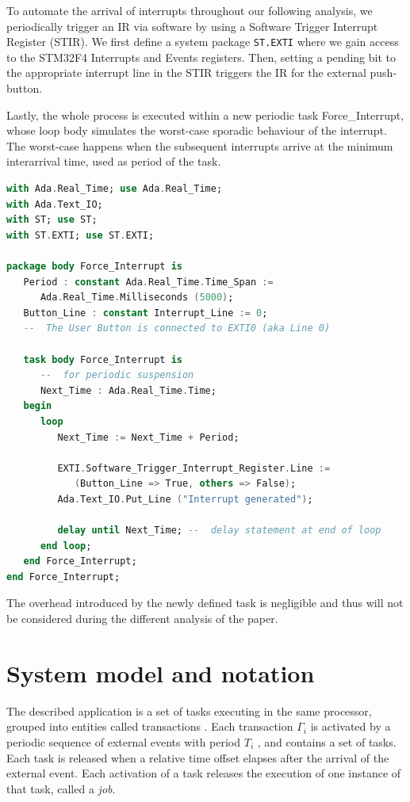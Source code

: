 \documentclass{article}
\begin{document}
To automate the arrival of interrupts throughout our following analysis, we periodically trigger an IR via software by using a Software Trigger Interrupt Register (STIR). We first define a system package \texttt{ST.EXTI} where we gain access to the STM32F4 Interrupts and Events registers. Then, setting a pending bit to the appropriate interrupt line in the STIR triggers the IR for the external push-button.

Lastly, the whole process is executed within a new periodic task Force\_Interrupt, whose loop body simulates the worst-case sporadic behaviour of the interrupt. The worst-case happens when the subsequent interrupts arrive at the minimum interarrival time, used as period of the task.

\begin{lstlisting}[language=Ada]
with Ada.Real_Time; use Ada.Real_Time;
with Ada.Text_IO;
with ST; use ST;
with ST.EXTI; use ST.EXTI;

package body Force_Interrupt is
   Period : constant Ada.Real_Time.Time_Span :=
      Ada.Real_Time.Milliseconds (5000);
   Button_Line : constant Interrupt_Line := 0;
   --  The User Button is connected to EXTI0 (aka Line 0)

   task body Force_Interrupt is
      --  for periodic suspension
      Next_Time : Ada.Real_Time.Time;
   begin
      loop
         Next_Time := Next_Time + Period;

         EXTI.Software_Trigger_Interrupt_Register.Line :=
            (Button_Line => True, others => False);
         Ada.Text_IO.Put_Line ("Interrupt generated");

         delay until Next_Time; --  delay statement at end of loop
      end loop;
   end Force_Interrupt;
end Force_Interrupt;
\end{lstlisting}

The overhead introduced by the newly defined task is negligible and thus will not be considered during the different analysis of the paper.

\section{System model and notation}\label{model-notation}

The described application is a set of tasks executing in the same processor, grouped into entities called transactions \cite{tindell-offsets}. Each transaction $\Gamma_i$ is activated by a periodic sequence of external events with period $T_i$ , and contains a set of tasks. Each task is released when a relative time offset elapses after the arrival of the external event. Each activation of a task releases the execution of one instance of that task, called a \textit{job}.
\end{document}
